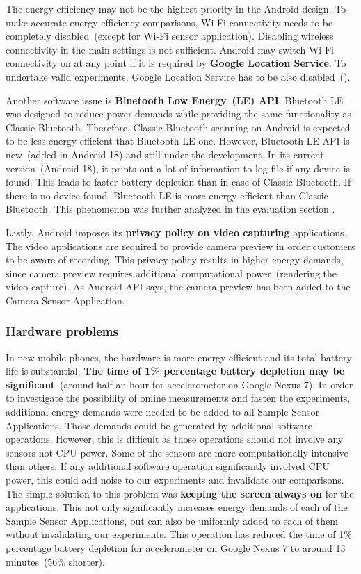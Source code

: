 The energy efficiency may not be the highest priority in the Android design. To make accurate energy efficiency comparisons, Wi-Fi connectivity needs to be completely disabled\ (except for Wi-Fi sensor application). Disabling wireless connectivity in the main settings is not sufficient. Android may switch Wi-Fi connectivity on at any point if it is required by \textbf{Google Location Service}. To undertake valid experiments, Google Location Service has to be also disabled\ (). 


Another software issue is \textbf{Bluetooth Low Energy\ (LE) API}. Bluetooth LE was designed to reduce power demands while providing the same functionality as Classic Bluetooth. Therefore, Classic Bluetooth scanning on Android is expected to be less energy-efficient that Bluetooth LE one. However, Bluetooth LE API is new\ (added in Android 18) and still under the development. In its current version\ (Android 18),  it prints out a lot of information to log file if any device is found. This leads to faster battery depletion than in case of Classic Bluetooth. If there is no device found, Bluetooth LE is more energy efficient than Classic Bluetooth. This phenomenon was further analyzed in the evaluation section . 

Lastly, Android imposes its \textbf{privacy policy on video capturing} applications. The video applications are required to provide camera preview in order customers to be aware of recording. This privacy policy results in higher energy demands, since camera preview requires additional computational power\ (rendering the video capture). As Android API says, the camera preview has been added to the Camera Sensor Application.
		
\subsubsection{Hardware problems}
\hspace{10pt} In new mobile phones, the hardware is more energy-efficient and its total battery life is substantial. \textbf{The time of 1\% percentage battery depletion may be significant}\ (around half an hour for accelerometer on Google Nexus 7). In order to investigate the possibility of online measurements and fasten the experiments, additional energy demands were needed to be added to all Sample Sensor Applications. Those demands could be generated by additional software operations. However, this is difficult as those operations should not involve any sensors not CPU power. Some of the sensors are more computationally intensive than others. If any additional software operation significantly involved CPU power, this could add noise to our experiments and invalidate our comparisons. The simple solution to this problem was \textbf{keeping the screen always on} for the applications.  This not only significantly increases energy demands of each of the Sample Sensor Applications, but can also be uniformly added to each of them without invalidating our experiments.  This operation has reduced the time of 1\% percentage battery depletion for accelerometer on Google Nexus 7 to around 13 minutes\ (56\% shorter).  

